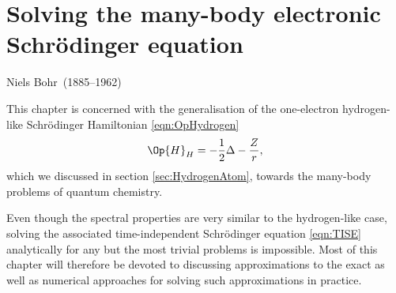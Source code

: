 \chapter{Solving the many-body electronic Schrödinger equation}
\label{ch:qchem}
{Niels Bohr~(1885--1962)} \\

\noindent
This chapter is concerned with the generalisation
of the one-electron hydrogen-like Schrödinger Hamiltonian \eqref{eqn:OpHydrogen}
\[
	\Op{H}_H = -\frac12 \Delta - \frac{Z}{r},
\]
which we discussed in section \vref{sec:HydrogenAtom},
towards the many-body problems of quantum chemistry.

Even though the spectral properties are very similar to the hydrogen-like case,
solving the associated time-independent
Schrödinger equation \eqref{eqn:TISE} analytically for
any but the most trivial problems is impossible.
Most of this chapter will therefore be devoted to
discussing approximations to the exact \TISE
as well as numerical approaches for solving such approximations
in practice.






